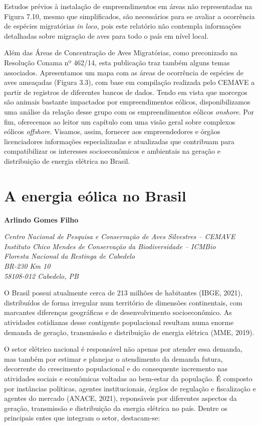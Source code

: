 \documentclass[
  oneside]{scrbook}
\begin{document}
Estudos prévios à instalação de empreendimentos em áreas não representadas na Figura 7.10, mesmo que simplificados, são necessários para se avaliar a ocorrência de espécies migratórias \emph{in loco}, pois este relatório não contempla informações detalhadas sobre migração de aves para todo o país em nível local.

Além das Áreas de Concentração de Aves Migratórias, como preconizado na Resolução Conama nº 462/14, esta publicação traz também alguns temas associados. Apresentamos um mapa com as áreas de ocorrência de espécies de aves ameaçadas (Figura 3.3), com base em compilação realizada pelo CEMAVE a partir de registros de diferentes bancos de dados. Tendo em vista que morcegos são animais bastante impactados por empreendimentos eólicos, disponibilizamos uma análise da relação desse grupo com os empreendimentos eólicos \emph{onshore}. Por fim, oferecemos ao leitor um capítulo com uma visão geral sobre complexos eólicos \emph{offshore}. Visamos, assim, fornecer aos empreendedores e órgãos licenciadores informações especializadas e atualizadas que contribuam para compatibilizar os interesses socioeconômicos e ambientais na geração e distribuição de energia elétrica no Brasil.

\hypertarget{cap1}{%
\chapter{A energia eólica no Brasil}\label{cap1}}

\pagestyle{headings}

\textbf{Arlindo Gomes Filho}

\emph{Centro Nacional de Pesquisa e Conservação de Aves Silvestres -- CEMAVE}\\
\emph{Instituto Chico Mendes de Conservação da Biodiversidade -- ICMBio}\\
\emph{Floresta Nacional da Restinga de Cabedelo}\\
\emph{BR-230 Km 10}\\
\emph{58108-012 Cabedelo, PB}

O Brasil possui atualmente cerca de 213 milhões de habitantes (IBGE, 2021), distribuídos de forma irregular num território de dimensões continentais, com marcantes diferenças geográficas e de desenvolvimento socioeconômico. As atividades cotidianas desse contigente populacional resultam numa enorme demanda de geração, transmissão e distribuição de energia elétrica (MME, 2019).

O setor elétrico nacional é responsável não apenas por atender essa demanda, mas também por estimar e planejar o atendimento da demanda futura, decorrente do crescimento populacional e do consequente incremento nas atividades sociais e econômicas voltadas ao bem-estar da população. É composto por instâncias políticas, agentes institucionais, órgãos de regulação e fiscalização e agentes do mercado (ANACE, 2021), reponsáveis por diferentes aspectos da geração, transmissão e distribuição da energia elétrica no país. Dentre os principais entes que integram o setor, destacam-se:
\end{document}
